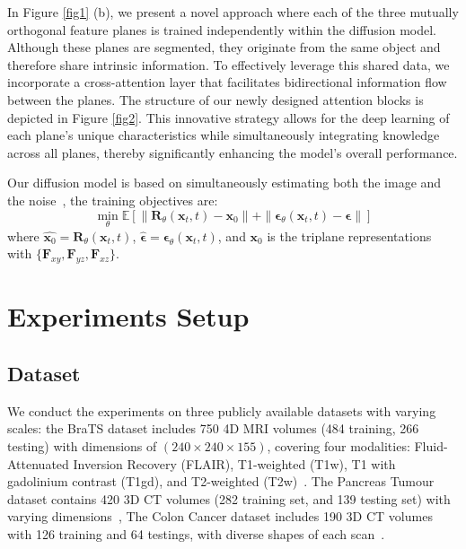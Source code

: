 \documentclass[letterpaper]{article} %
\begin{document}
In Figure \ref{fig1} (b), we present a novel approach where each of the three mutually orthogonal feature planes is trained independently within the diffusion model. Although these planes are segmented, they originate from the same object and therefore share intrinsic information. To effectively leverage this shared data, we incorporate a cross-attention layer that facilitates bidirectional information flow between the planes. The structure of our newly designed attention blocks is depicted in Figure \ref{fig2}. This innovative strategy allows for the deep learning of each plane’s unique characteristics while simultaneously integrating knowledge across all planes, thereby significantly enhancing the model’s overall performance.

Our diffusion model is based on simultaneously estimating both the image and the noise~\cite{Zhang2023ImprovingDD}, the training objectives are:
\begin{equation}
    \min_\theta \mathbb{E}\left[ \|\mathbf{R}_\theta(\mathbf{x}_t, t) - \mathbf{x}_0 \| + \|\mathbf{\epsilon}_\theta(\mathbf{x}_t, t) - \mathbf{\epsilon} \| \right]
\end{equation}
where $\widehat{\mathbf{x}_0} = \mathbf{R}_\theta(\mathbf{x}_t, t)$, $\widehat{\mathbf{\epsilon}}=\mathbf{\epsilon}_\theta(\mathbf{x}_t, t)$, and $\mathbf{x}_0$ is the triplane representations with $\{\mathbf{F}_{xy}, \mathbf{F}_{yz}, \mathbf{F}_{xz}\}$.

\section{Experiments Setup}
\subsection{Dataset}
We conduct the experiments on three publicly available datasets with varying scales: the BraTS dataset includes 750 4D MRI volumes (484 training, 266 testing) with dimensions of $(240\times240\times155)$, covering four modalities: Fluid-Attenuated Inversion Recovery (FLAIR), T1-weighted (T1w), T1 with gadolinium contrast (T1gd), and T2-weighted (T2w)~\cite{menze2014,Simpson2019ALA}. The Pancreas Tumour dataset contains 420 3D CT volumes (282 training set, and 139 testing set) with varying dimensions~\cite{Simpson2019ALA}, The Colon Cancer dataset includes 190 3D CT volumes with 126 training and 64 testings, with diverse shapes of each scan~\cite{Simpson2019ALA}.
\end{document}
